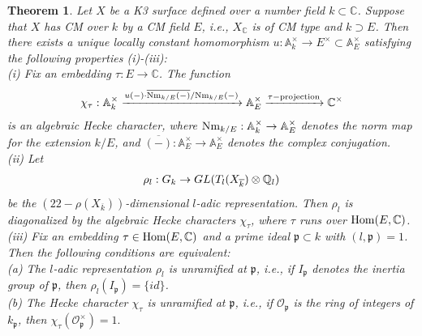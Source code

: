\documentclass[reqno,a4paper,11pt]{amsart}
\newtheorem{thm}[dfn]{Theorem}
\theoremstyle{definition}
\theoremstyle{definition}
\begin{document}
    \begin{thm}\label{main theorem} 
        Let $X$ be a K3 surface defined over a number field $k\subset \mathbb{C}$. Suppose that $X$ has CM over $k$ by a  CM field $E$, i.e., $X_{\mathbb{C}}$ is of CM type and $k\supset E$. Then there exists a unique locally constant homomorphism $u : \mathbb{A}^{\times}_{k} \to E^{\times}\subset \mathbb{A}^{\times}_{E}$ satisfying the following properties (i)-(iii):
        \\ \indent (i) Fix an embedding $\tau : E\to \mathbb{C}$. The function \begin{align}
            \chi_{\tau} : \mathbb{A}^{\times}_{k}\xrightarrow{u(-)\cdot \overline{{\rm Nm}_{k/E}(-)}/{\rm Nm}_{k/E}(-)} \mathbb{A}^{\times}_{E}\xrightarrow{\tau-{\rm projection}} \mathbb{C}^{\times}\notag\end{align}
         is an algebraic Hecke character, where ${\rm Nm}_{k/E} : \mathbb{A}^{\times}_{k}\to \mathbb{A}^{\times}_{E}$ denotes the norm map for the extension $k/E$, and $\overline{(-)} : \mathbb{A}^{\times}_{E}\to \mathbb{A}^{\times}_{E}$ denotes the complex conjugation.
        \\\indent (ii) Let \begin{align}\rho_{l} : G_{k}\to GL(T_{l}(X_{\overline{k}})\otimes \mathbb{Q}_{l}) \notag
        \end{align}
    be the $(22-\rho(X_{\overline{k}}))$-dimensional $l$-adic representation. Then $\rho_{l}$ is diagonalized by the algebraic Hecke characters $\chi_{\tau}$, where $\tau$ runs over ${\rm Hom}(E, \mathbb{C})$.
    \\ \indent (iii) Fix an embedding $\tau\in {\rm Hom}(E, \mathbb{C})$ and a prime ideal $\mathfrak{p}\subset k$ with $(l, \mathfrak{p})=1$. Then the following conditions are equivalent: 
     \\(a) The $l$-adic representation $\rho_{l}$ is unramified at $\mathfrak{p}$, i.e., if $I_{\mathfrak{p}}$ denotes the inertia group of $\mathfrak{p}$, then $\rho_{l}(I_{\mathfrak{p}})=\{id\}$.
     \\(b) The Hecke character $\chi_{\tau}$ is unramified at $\mathfrak{p}$, i.e., if $\mathscr{O}_{\mathfrak{p}}$ is the ring of integers of $k_{\mathfrak{p}}$, then  $\chi_{\tau}(\mathscr{O}^{\times}_{\mathfrak{p}})=1.$
       \end{thm}
\end{document}
